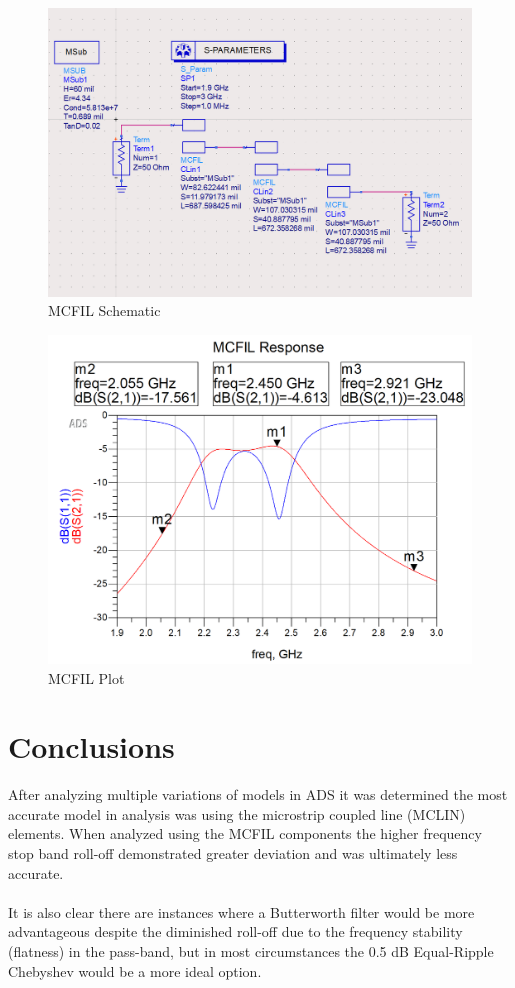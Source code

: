 \documentclass{article}
\begin{document}
\begin{figure}[h!]
    \centering
    \includegraphics[scale=0.4]{images/mcfil_schematic.png}
    \caption{MCFIL Schematic}
    \label{fig:12}
\end{figure}
\begin{figure}[h!]
    \centering
    \includegraphics[scale=0.3]{images/mcfil_plot.png}
    \caption{MCFIL Plot}
    \label{fig:13}
\end{figure}


\section{Conclusions}
After analyzing multiple variations of models in ADS it was determined the most accurate model in analysis was using the microstrip coupled line (MCLIN) elements. When analyzed using the MCFIL components the higher frequency stop band roll-off demonstrated greater deviation and was ultimately less accurate.\\
\text{ }\\
It is also clear there are instances where a Butterworth filter would be more advantageous despite the diminished roll-off due to the frequency stability (flatness) in the pass-band, but in most circumstances the 0.5 dB Equal-Ripple Chebyshev would be a more ideal option.\\
\text{  }\\
\end{document}
